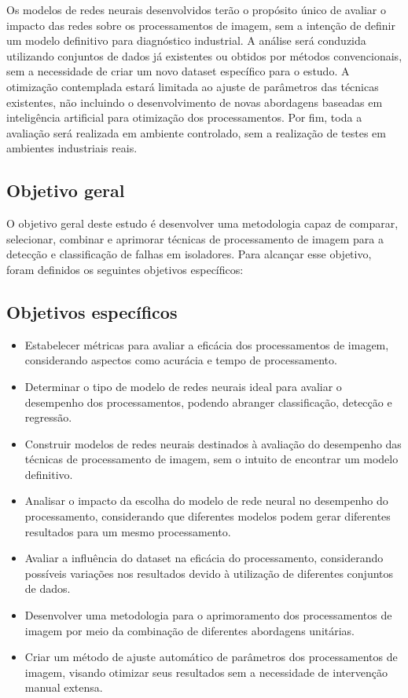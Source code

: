 Os modelos de redes neurais desenvolvidos terão o propósito único de avaliar o impacto das redes sobre os processamentos de imagem, sem a intenção de definir um modelo definitivo para diagnóstico industrial. A análise será conduzida utilizando conjuntos de dados já existentes ou obtidos por métodos convencionais, sem a necessidade de criar um novo dataset específico para o estudo. A otimização contemplada estará limitada ao ajuste de parâmetros das técnicas existentes, não incluindo o desenvolvimento de novas abordagens baseadas em inteligência artificial para otimização dos processamentos. Por fim, toda a avaliação será realizada em ambiente controlado, sem a realização de testes em ambientes industriais reais.

\subsection{Objetivo geral}

O objetivo geral deste estudo é desenvolver uma metodologia capaz de comparar, selecionar, combinar e aprimorar técnicas de processamento de imagem para a detecção e classificação de falhas em isoladores. Para alcançar esse objetivo, foram definidos os seguintes objetivos específicos:

\subsection{Objetivos específicos}

\begin{itemize}
    \item Estabelecer métricas para avaliar a eficácia dos processamentos de imagem, considerando aspectos como acurácia e tempo de processamento.
    \item Determinar o tipo de modelo de redes neurais ideal para avaliar o desempenho dos processamentos, podendo abranger classificação, detecção e regressão.
    \item Construir modelos de redes neurais destinados à avaliação do desempenho das técnicas de processamento de imagem, sem o intuito de encontrar um modelo definitivo.
    \item Analisar o impacto da escolha do modelo de rede neural no desempenho do processamento, considerando que diferentes modelos podem gerar diferentes resultados para um mesmo processamento.
    \item Avaliar a influência do dataset na eficácia do processamento, considerando possíveis variações nos resultados devido à utilização de diferentes conjuntos de dados.
    \item Desenvolver uma metodologia para o aprimoramento dos processamentos de imagem por meio da combinação de diferentes abordagens unitárias.
    \item Criar um método de ajuste automático de parâmetros dos processamentos de imagem, visando otimizar seus resultados sem a necessidade de intervenção manual extensa.
\end{itemize}

